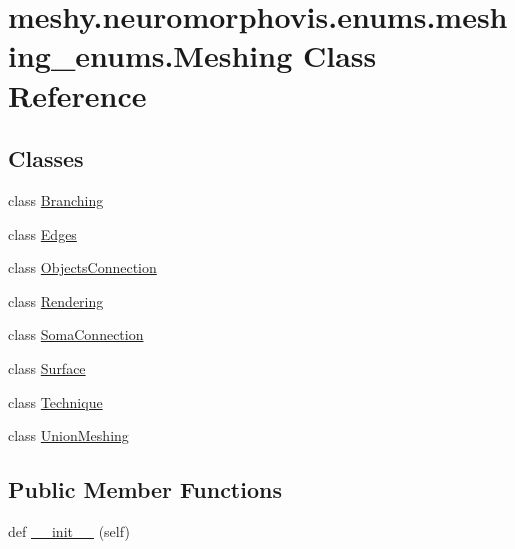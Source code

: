 \hypertarget{classmeshy_1_1neuromorphovis_1_1enums_1_1meshing__enums_1_1Meshing}{}\section{meshy.\+neuromorphovis.\+enums.\+meshing\+\_\+enums.\+Meshing Class Reference}
\label{classmeshy_1_1neuromorphovis_1_1enums_1_1meshing__enums_1_1Meshing}


 


\subsection*{Classes}
\begin{DoxyCompactItemize}
\item 
class \hyperlink{classmeshy_1_1neuromorphovis_1_1enums_1_1meshing__enums_1_1Meshing_1_1Branching}{Branching}
\item 
class \hyperlink{classmeshy_1_1neuromorphovis_1_1enums_1_1meshing__enums_1_1Meshing_1_1Edges}{Edges}
\item 
class \hyperlink{classmeshy_1_1neuromorphovis_1_1enums_1_1meshing__enums_1_1Meshing_1_1ObjectsConnection}{Objects\+Connection}
\item 
class \hyperlink{classmeshy_1_1neuromorphovis_1_1enums_1_1meshing__enums_1_1Meshing_1_1Rendering}{Rendering}
\item 
class \hyperlink{classmeshy_1_1neuromorphovis_1_1enums_1_1meshing__enums_1_1Meshing_1_1SomaConnection}{Soma\+Connection}
\item 
class \hyperlink{classmeshy_1_1neuromorphovis_1_1enums_1_1meshing__enums_1_1Meshing_1_1Surface}{Surface}
\item 
class \hyperlink{classmeshy_1_1neuromorphovis_1_1enums_1_1meshing__enums_1_1Meshing_1_1Technique}{Technique}
\item 
class \hyperlink{classmeshy_1_1neuromorphovis_1_1enums_1_1meshing__enums_1_1Meshing_1_1UnionMeshing}{Union\+Meshing}
\end{DoxyCompactItemize}
\subsection*{Public Member Functions}
\begin{DoxyCompactItemize}
\item 
def \hyperlink{classmeshy_1_1neuromorphovis_1_1enums_1_1meshing__enums_1_1Meshing_a631c2236b5a441ba52b2fbf5579d0474}{\+\_\+\+\_\+init\+\_\+\+\_\+} (self)\hypertarget{classmeshy_1_1neuromorphovis_1_1enums_1_1meshing__enums_1_1Meshing_a631c2236b5a441ba52b2fbf5579d0474}{}\label{classmeshy_1_1neuromorphovis_1_1enums_1_1meshing__enums_1_1Meshing_a631c2236b5a441ba52b2fbf5579d0474}

\end{DoxyCompactItemize}


